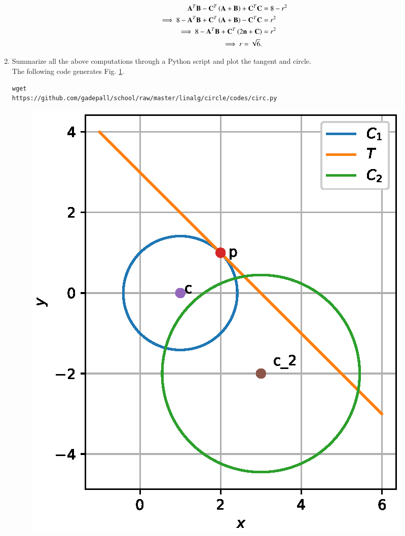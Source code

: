 \begin{enumerate}[label=\arabic*.,ref=\thesubsection.\theenumi]
\begin{align}
 \mathbf{A}^T\mathbf{B}  -\mathbf{C}^T\left(\mathbf{A}+\mathbf{B}\right)+\mathbf{C}^T\mathbf{C} &=8 - r^2
\\
\implies 8 - \mathbf{A}^T\mathbf{B}  +\mathbf{C}^T\left(\mathbf{A}+\mathbf{B}\right)-\mathbf{C}^T\mathbf{C} &= r^2
\\
\implies 8 - \mathbf{A}^T\mathbf{B}  +\mathbf{C}^T\left(2\mathbf{n}+\mathbf{C}\right) &= r^2
\\
\implies r =  \sqrt{6}.
\end{align}
\item Summarize all the above computations through a Python script and plot 
the tangent and circle.
\\
\solution The following code generates Fig. \ref{fig:circle}.
\begin{lstlisting}
wget 
https://github.com/gadepall/school/raw/master/linalg/circle/codes/circ.py
\end{lstlisting}
\begin{figure}
\centering
\includegraphics[width=\columnwidth]{./circle/figs/circle.eps}
\caption{}
\label{fig:circle}
\end{figure}

\end{enumerate}


